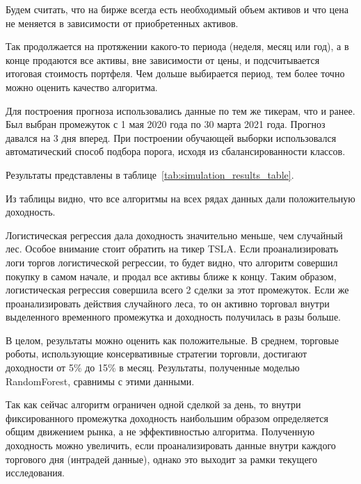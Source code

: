 \documentclass[a4paper,article,14pt]{extarticle}
\begin{document}
Будем считать, что на бирже всегда есть необходимый объем активов и что цена не меняется в зависимости от приобретенных активов.
\par

Так продолжается на протяжении какого-то периода (неделя, месяц или год), а в конце продаются все активы, вне зависимости от цены, и подсчитывается итоговая стоимость портфеля.
Чем дольше выбирается период, тем более точно можно оценить качество алгоритма.
\par


Для построения прогноза использовались данные по тем же тикерам, что и ранее.
Был выбран промежуток с 1 мая 2020 года по 30 марта 2021 года.
Прогноз давался на 3 дня вперед.
При построении обучающей выборки использовался автоматический способ подбора порога, исходя из сбалансированности классов.

Результаты представлены в таблице~\ref{tab:simulation_results_table}.

Из таблицы видно, что все алгоритмы на всех рядах данных дали положительную доходность.

Логистическая регрессия дала доходность значительно меньше, чем случайный лес.
Особое внимание стоит обратить на тикер TSLA.
Если проанализировать логи торгов логистической регрессии, то будет видно, что алгоритм совершил покупку в самом начале, и продал все активы ближе к концу.
Таким образом, логистическая регрессия совершила всего 2 сделки за этот промежуток.
Если же проанализировать действия случайного леса, то он активно торговал внутри выделенного временного промежутка и доходность получилась в разы больше.

В целом, результаты можно оценить как положительные.
В среднем, торговые роботы, использующие консервативные стратегии торговли, достигают доходности от 5\% до 15\% в месяц.
Результаты, полученные моделью RandomForest, сравнимы с этими данными.

Так как сейчас алгоритм ограничен одной сделкой за день, то внутри фиксированного промежутка доходность наибольшим образом определяется общим движением рынка, а не эффективностью алгоритма.
Полученную доходность можно увеличить, если проанализировать данные внутри каждого торгового дня (интрадей данные), однако это выходит за рамки текущего исследования.
\end{document}
